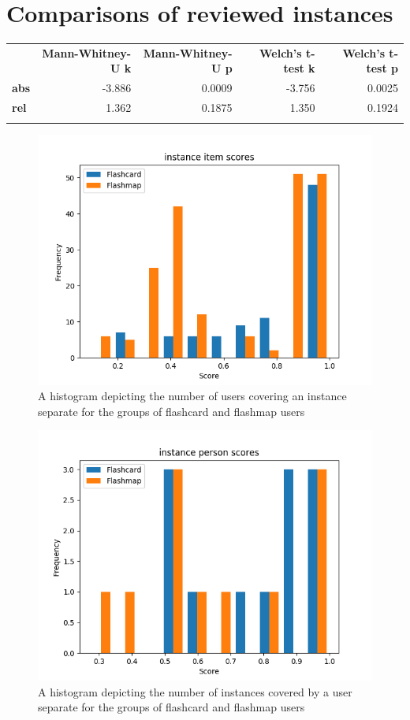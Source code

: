 \section{Comparisons of reviewed instances}

\begin{longtable}[c]{@{}lrrrr@{}}
\toprule\addlinespace
& \textbf{Mann-Whitney-U k} & \textbf{Mann-Whitney-U p} &
\textbf{Welch's t-test k} & \textbf{Welch's t-test p}
\\\addlinespace
\midrule\endhead
\textbf{abs} & -3.886 & 0.0009 & -3.756 & 0.0025
\\\addlinespace
\textbf{rel} & 1.362 & 0.1875 & 1.350 & 0.1924
\\\addlinespace
\bottomrule
\end{longtable}

\begin{figure}
    \centering
    \includegraphics[width=.7\textwidth]{img/instance_diff.png}
    \caption{A histogram depicting the number of users covering an instance separate for the groups of flashcard and flashmap users}
    \label{fig:instance_diff}
\end{figure}
\begin{figure}
    \centering
    \includegraphics[width=.7\textwidth]{img/instance_abil.png}
    \caption{A histogram depicting the number of instances covered by a user separate for the groups of flashcard and flashmap users}
    \label{fig:instance_abil}
\end{figure}

